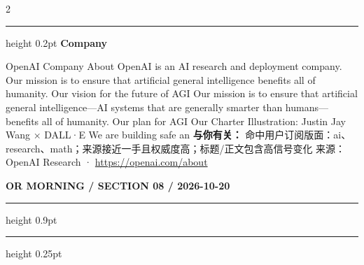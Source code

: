 \documentclass[10.5pt]{ctexart}
\begin{document}
\begin{multicols}{2}
\vspace{2mm}
\hrule height 0.2pt
\vspace{2mm}
{\large\bfseries Company}\par
OpenAI Company About OpenAI is an AI research and deployment company. Our mission is to ensure that artificial general intelligence benefits all of humanity. Our vision for the future of AGI Our mission is to ensure that artificial general intelligence—AI systems that are generally smarter than humans—benefits all of humanity. Our plan for AGI Our Charter Illustration: Justin Jay Wang × DALL·E We are building safe an
\textbf{与你有关：} 命中用户订阅版面：ai、research、math；来源接近一手且权威度高；标题/正文包含高信号变化
{\footnotesize\color{ormuted} 来源：OpenAI Research · \url{https://openai.com/about}}
\end{multicols}
\newpage
{\small\bfseries OR MORNING / SECTION 08 / 2026-10-20}
\vspace{2mm}
\hrule height 0.9pt
\vspace{1.5mm}
\hrule height 0.25pt
\vspace{4mm}
\end{document}
